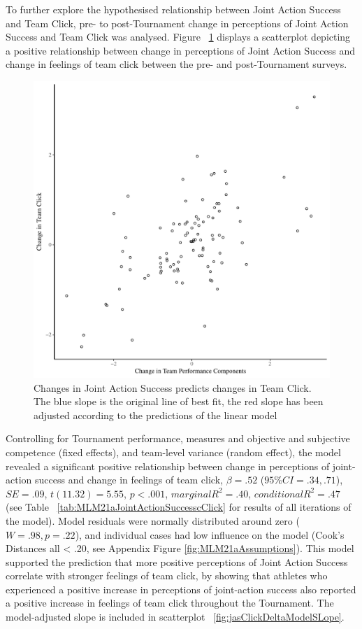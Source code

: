 To further explore the hypothesised relationship between Joint Action Success and Team Click, pre- to post-Tournament change in perceptions of Joint Action Success and Team Click was analysed.  Figure ~\ref{fig:jasClickDeltaBasicXY} displays a scatterplot depicting a positive relationship between change in perceptions of Joint Action Success and change in feelings of team click between the pre- and post-Tournament surveys.

\begin{figure}[htbp]
  \centering
\includegraphics[scale=.5]{images/jasClickDeltaBasicXY}
  \caption{Changes in Joint Action Success predicts changes in Team Click. The blue slope is the original line of best fit, the red slope has been adjusted according to the predictions of the linear model}
  \label{fig:jasClickDeltaBasicXY}
\end{figure}

Controlling for Tournament performance, measures and objective and subjective competence (fixed effects), and team-level variance (random effect), the model revealed a significant positive relationship between change in perceptions of joint-action success and change in feelings of team click, $\beta = .52$ ($95\% CI =  .34, .71$), $SE = .09$, $t(11.32) = 5.55$, $p < .001$, $marginal R^2 = .40$, $conditional R^2 = .47$ (see Table ~\ref{tab:MLM21aJointActionSuccesscClick} for results of all iterations of the model).  Model residuals were normally distributed around zero ($W = .98, p = .22$), and individual cases had low influence on the model (Cook's Distances all < .20, see Appendix Figure \ref{fig:MLM21aAssumptions}).  This model supported the prediction that more positive perceptions of Joint Action Success correlate with stronger feelings of team click, by showing that athletes who experienced a positive increase in perceptions of joint-action success also reported a positive increase in feelings of team click throughout the Tournament.
The model-adjusted slope is included in scatterplot ~\ref{fig:jasClickDeltaModelSLope}.

